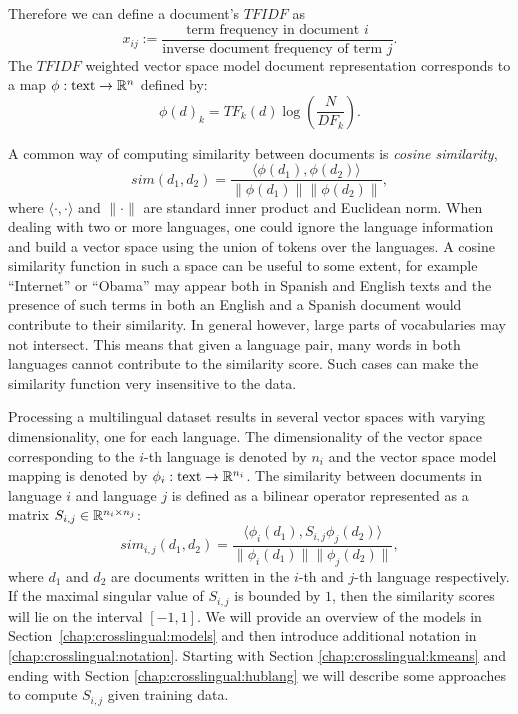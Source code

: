 Therefore we can define a document's $TFIDF$ as
$$ x_{ij}  := \frac{\mbox{term frequency in document } i}{\mbox{inverse document frequency of term } j}.$$
The $TFIDF$ weighted vector space model document representation corresponds 
to a map $\phi : \text{text} \rightarrow \mathbb{R}^n$ defined by: 
$$\phi(d)_k = {TF}_k(d) \log\left( \frac{N}{{DF}_k}\right).$$

A common way of computing similarity between documents is \emph{cosine similarity},
$$sim(d_1, d_2) = \frac{\langle \phi(d_1), \phi(d_2)\rangle}{\|\phi(d_1)\| \|\phi(d_2)\|},$$
where $\langle \cdot,\cdot \rangle$ and $\|\cdot\|$ are standard inner product and 
Euclidean norm. When dealing with two or more languages, one could ignore the language information
and build a vector space using the union of tokens over the languages. A cosine similarity 
function in such a space can be useful to some extent, for example ``Internet'' or ``Obama'' 
may appear both in Spanish and English texts and the presence of such terms in both an 
English and a Spanish document would contribute to their similarity. In general however, 
large parts of vocabularies may not intersect. This means that given a language pair, 
many words in both languages cannot contribute to the similarity score. Such cases 
can make the similarity function very insensitive to the data.

Processing a multilingual dataset results in several vector spaces with varying dimensionality, 
one for each language. The dimensionality of the vector space corresponding to the $i$-th 
language is denoted by $n_i$ and the vector space model mapping is denoted by 
$\phi_i : \text{text} \rightarrow \mathbb{R}^{n_i}$.
The similarity between documents in language $i$ and language $j$ is defined as a bilinear 
operator represented as a matrix $S_{i,j} \in \mathbb{R}^{n_i \times n_j}$:
$$sim_{i,j}(d_1, d_2) = \frac{ \langle \phi_i (d_1), S_{i,j} \phi_j (d_2) \rangle }{\|\phi_i(d_1)\| \|\phi_j(d_2)\|},$$
where $d_1$ and $d_2$ are documents written in the $i$-th and $j$-th language respectively. 
If the maximal singular value of $S_{i,j}$ is bounded by $1$, then the similarity scores 
will lie on the interval $[-1, 1]$. We will provide an overview of the models in 
Section~\ref{chap:crosslingual:models} and then introduce additional notation in \ref{chap:crosslingual:notation}.
Starting with Section \ref{chap:crosslingual:kmeans} and ending with Section \ref{chap:crosslingual:hublang} we will
describe some approaches to compute $S_{i,j}$ given training data.

